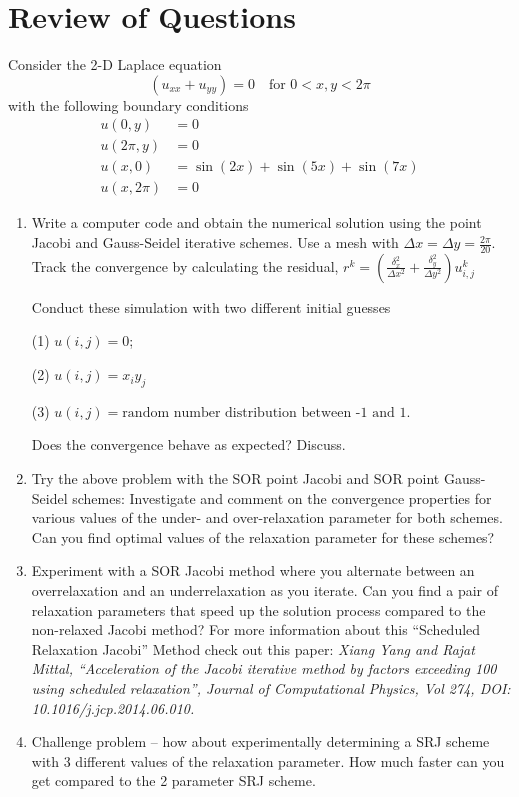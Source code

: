 \documentclass[12pt]{article}
\begin{document}
\section{Review of Questions}




\noindent Consider the 2-D Laplace equation
\begin{equation*}
    (u_{xx} + u_{yy}) = 0 \quad \text{for } 0 < x,y < 2\pi
\end{equation*}
with the following boundary conditions
\begin{align*}
    u(0,y) &= 0 \\
    u(2\pi,y) &= 0 \\
    u(x,0) &= \sin(2x) + \sin(5x) + \sin(7x) \\
    u(x,2\pi) &= 0
\end{align*}

\begin{enumerate}
    \item Write a computer code and obtain the numerical solution 
    using the point Jacobi and Gauss-Seidel iterative schemes. Use 
    a mesh with $\Delta x = \Delta y = \frac{2\pi}{20}$. Track the 
    convergence by calculating the residual, 
    $r^k = (\frac{\delta_{x}^2}{\Delta x^2} + \frac{\delta_{y}^2}{\Delta y^2} ) u_{i,j}^k$
    
    Conduct these simulation with two different initial guesses 

    (1) $u(i,j) = 0$; 

    (2) $u(i,j) = {x_i}y_j$

    (3) $u(i,j) = \text{random number distribution between -1 and 1.}$

    Does the convergence behave as expected? Discuss.

    \item Try the above problem with the SOR point Jacobi and 
    SOR point Gauss-Seidel schemes: Investigate and comment on 
    the convergence properties for various values of the under- 
    and over-relaxation parameter for both schemes. Can you find 
    optimal values of the relaxation parameter for these schemes?

    \item Experiment with a SOR Jacobi method where you alternate 
    between an overrelaxation and an underrelaxation as you iterate. 
    Can you find a pair of relaxation parameters that speed up the 
    solution process compared to the non-relaxed Jacobi method? For 
    more information about this ``Scheduled Relaxation Jacobi'' Method 
    check out this paper: \textit{Xiang Yang and Rajat Mittal, ``Acceleration 
    of the Jacobi iterative method by factors exceeding 100 using 
    scheduled relaxation'', Journal of Computational Physics, Vol 274, 
    DOI: 10.1016/j.jcp.2014.06.010.}

    \item Challenge problem – how about experimentally determining 
    a SRJ scheme with 3 different values of the relaxation parameter.
     How much faster can you get compared to the 2 parameter SRJ scheme.
\end{enumerate}
\end{document}
